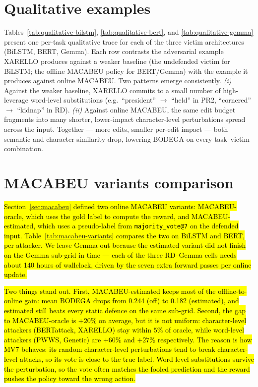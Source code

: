 \documentclass[11pt]{article}
\begin{document}
\section{Qualitative examples}
\label{sec:appendix-extra-figs}

Tables~\ref{tab:qualitative-bilstm}, \ref{tab:qualitative-bert}, and \ref{tab:qualitative-gemma} present one per-task qualitative trace for each of the three victim architectures (BiLSTM, BERT, Gemma). Each row contrasts the adversarial example XARELLO produces against a weaker baseline (the undefended victim for BiLSTM; the offline MACABEU policy for BERT/Gemma) with the example it produces against online MACABEU. Two patterns emerge consistently. \emph{(i)} Against the weaker baseline, XARELLO commits to a small number of high-leverage word-level substitutions (e.g.\ ``president'' $\to$ ``held'' in PR2, ``cornered'' $\to$ ``kidnap'' in RD). \emph{(ii)} Against online MACABEU, the same edit budget fragments into many shorter, lower-impact character-level perturbations spread across the input. Together --- more edits, smaller per-edit impact --- both semantic and character similarity drop, lowering BODEGA on every task--victim combination.








\section{MACABEU variants comparison}
\label{sec:appendix-macabeu-variants}

\hl{Section~\ref{sec:macabeu} defined two online MACABEU variants: MACABEU-oracle, which uses the gold label to compute the reward, and MACABEU-estimated, which uses a pseudo-label from \mbox{\texttt{majority\_vote@7}} on the defended input. Table~\ref{tab:macabeu-variants} compares the two on BiLSTM and BERT, per attacker. We leave Gemma out because the estimated variant did not finish on the Gemma sub-grid in time --- each of the three RD--Gemma cells needs about 140 hours of wallclock, driven by the seven extra forward passes per online update.}



\hl{Two things stand out. First, MACABEU-estimated keeps most of the offline-to-online gain: mean BODEGA drops from 0.244 (off) to 0.182 (estimated), and estimated still beats every static defence on the same sub-grid. Second, the gap to MACABEU-oracle is $+20\%$ on average, but it is not uniform: character-level attackers (BERTattack, XARELLO) stay within $5\%$ of oracle, while word-level attackers (PWWS, Genetic) are $+60\%$ and $+27\%$ respectively. The reason is how MV7 behaves: its random character-level perturbations tend to break character-level attacks, so its vote is close to the true label. Word-level substitutions survive the perturbation, so the vote often matches the fooled prediction and the reward pushes the policy toward the wrong action.}
\end{document}

